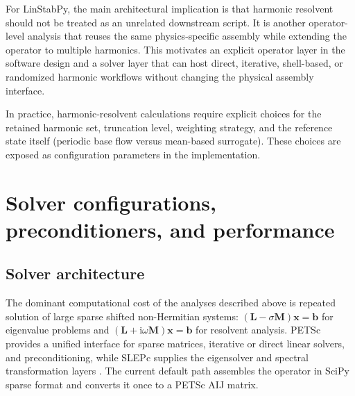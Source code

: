 \documentclass[11pt]{article}
\newcommand{\bx}{\mathbf{x}}
\newcommand{\bL}{\mathbf{L}}
\newcommand{\bM}{\mathbf{M}}
\newcommand{\bb}{\mathbf{b}}
\begin{document}
For LinStabPy, the main architectural implication is that harmonic resolvent
should not be treated as an unrelated downstream script. It is another
operator-level analysis that reuses the same physics-specific assembly while
extending the operator to multiple harmonics. This motivates an explicit
operator layer in the software design and a solver layer that can host direct,
iterative, shell-based, or randomized harmonic workflows without changing the
physical assembly interface.

In practice, harmonic-resolvent calculations require explicit choices for the
retained harmonic set, truncation level, weighting strategy, and the reference
state itself (periodic base flow versus mean-based surrogate). These choices
are exposed as configuration parameters in the implementation.

\section{Solver configurations, preconditioners, and performance}
\label{sec:solvers}

\subsection{Solver architecture}
\label{sec:design}

The dominant computational cost of the analyses described above is repeated
solution of large sparse shifted non-Hermitian systems:
$(\bL - \sigma \bM)\bx = \bb$ for eigenvalue problems and
$(\bL + \mathrm{i}\omega \bM)\bx = \bb$ for resolvent analysis. PETSc provides
a unified interface for sparse matrices, iterative or direct linear solvers,
and preconditioning, while SLEPc supplies the eigensolver and spectral
transformation layers \citep{balay2025petsc,hernandez2005slepc}. The current
default path assembles the operator in SciPy sparse format and converts it once
to a PETSc AIJ matrix.
\end{document}
